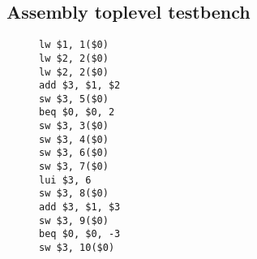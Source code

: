 \subsection{Assembly toplevel testbench}

\begin{figure}[h]
\begin{verbatim}
lw $1, 1($0)
lw $2, 2($0)
lw $2, 2($0)
add $3, $1, $2
sw $3, 5($0)
beq $0, $0, 2
sw $3, 3($0)
sw $3, 4($0)
sw $3, 6($0)
sw $3, 7($0)
lui $3, 6
sw $3, 8($0)
add $3, $1, $3
sw $3, 9($0)
beq $0, $0, -3
sw $3, 10($0)
\end{verbatim}
\end{figure}
